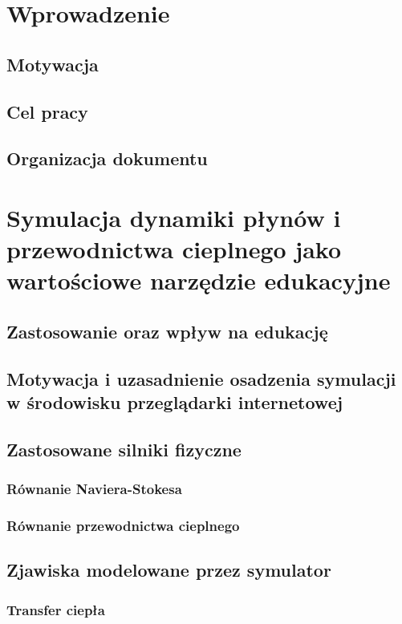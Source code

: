 \documentclass[pdflatex,11pt]{aghdpl}
\author{Piotr Janik}
\date{2012}
\begin{document}
\titlepages



\tableofcontents
\clearpage

\chapter{Wprowadzenie}
	\section{Motywacja}
	\section{Cel pracy}
	\section{Organizacja dokumentu}

	
	
\chapter{Symulacja dynamiki płynów i przewodnictwa cieplnego jako wartościowe narzędzie edukacyjne}
	\section{Zastosowanie oraz wpływ na edukację}
	\section{Motywacja i uzasadnienie osadzenia symulacji w środowisku przeglądarki internetowej}
	\section{Zastosowane silniki fizyczne}
		\subsection{Równanie Naviera-Stokesa}
		\subsection{Równanie przewodnictwa cieplnego}
	\section{Zjawiska modelowane przez symulator}
		\subsection{Transfer ciepła}
\end{document}
